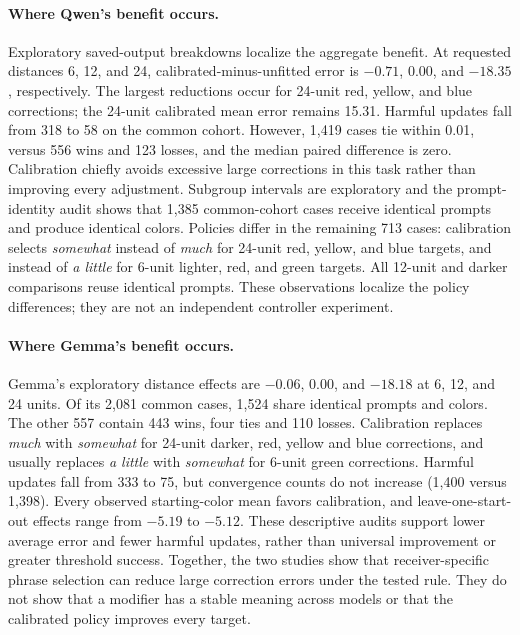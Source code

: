 \documentclass[11pt]{article}
\begin{document}
\paragraph{Where Qwen's benefit occurs.}
Exploratory saved-output breakdowns localize the aggregate benefit. At
requested distances 6, 12, and 24, calibrated-minus-unfitted error is
$-0.71$, $0.00$, and $-18.35$, respectively. The largest reductions occur
for 24-unit red, yellow, and blue corrections; the 24-unit calibrated
mean error remains 15.31. Harmful updates fall from 318 to 58 on the
common cohort. However, 1{,}419 cases tie within 0.01, versus 556 wins
and 123 losses, and the median paired difference is zero. Calibration
chiefly avoids excessive large corrections in this task rather than
improving every adjustment. Subgroup intervals are exploratory and
the prompt-identity audit shows that 1{,}385 common-cohort cases receive
identical prompts and produce identical colors. Policies differ in the
remaining 713 cases: calibration selects \textit{somewhat} instead of
\textit{much} for 24-unit red, yellow, and blue targets, and instead of
\textit{a little} for 6-unit lighter, red, and green targets. All 12-unit
and darker comparisons reuse identical prompts. These observations localize
the policy differences; they are not an independent controller experiment.

\paragraph{Where Gemma's benefit occurs.}
Gemma's exploratory distance effects are $-0.06$, $0.00$, and $-18.18$
at 6, 12, and 24 units. Of its 2{,}081 common cases, 1{,}524 share identical
prompts and colors. The other 557 contain 443 wins, four ties and 110 losses.
Calibration replaces \textit{much} with \textit{somewhat} for 24-unit darker,
red, yellow and blue corrections, and usually replaces \textit{a little}
with \textit{somewhat} for 6-unit green corrections. Harmful updates fall
from 333 to 75, but convergence counts do not increase (1{,}400 versus
1{,}398). Every observed starting-color mean favors calibration, and
leave-one-start-out effects range from $-5.19$ to $-5.12$.
These descriptive audits support lower average error and fewer harmful
updates, rather than universal improvement or greater threshold success.
Together, the two studies show that receiver-specific phrase selection
can reduce large correction errors under the tested rule. They do not
show that a modifier has a stable meaning across models or that the
calibrated policy improves every target.
\end{document}
